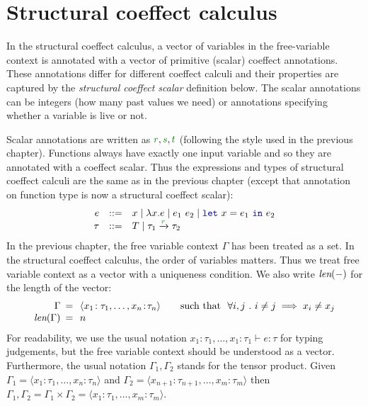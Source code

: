 \section{Structural coeffect calculus}
\label{sec:struct-calculus}

In the structural coeffect calculus, a vector of variables in the free-variable context is 
annotated with a vector of primitive (scalar) coeffect annotations. These annotations differ
for different coeffect calculi and their properties are captured by the \emph{structural 
coeffect scalar} definition below. The scalar annotations can be integers (how many past values we 
need) or annotations specifying whether a variable is live or not.

Scalar annotations are written as $\cclrd{r}, \cclrd{s}, \cclrd{t}$ (following the style used in 
the previous chapter). Functions always have exactly one input variable and so they are annotated
with a coeffect scalar. Thus the expressions and types of structural coeffect calculi are the same
as in the previous chapter (except that annotation on function type is now a structural coeffect 
scalar):
%
\begin{equation*}
\begin{array}{rcl}
e &::=& x \sep \lambda x.e \sep e_1~e_2 \sep \kvd{let}~x = e_1~\kvd{in}~e_2\\
\tau &::=& T \sep \tau_1 \xrightarrow{\cclrd{r}} \tau_2
\end{array}
\end{equation*}
%
In the previous chapter, the free variable context $\Gamma$ has been treated as a set. In the 
structural coeffect calculus, the order of variables matters. Thus we treat free variable context
as a vector with a uniqueness condition. We also write ${\textit{len}(-)}$ for the length
of the vector:
%
\begin{equation*}
\begin{array}{rcl}
 \Gamma &\narrow{=}& \langle x_1\!:\tau_1, \ldots, x_n\!:\!\tau_n \rangle \qquad \textnormal{such that}~~\forall i, j ~.~ i \neq j \implies x_i \neq x_j\\
 \xlen{\Gamma} &\narrow{=}& n
\end{array}
\end{equation*}
%
For readability, we use the usual notation $x_1\!:\!\tau_1, \ldots, x_1\!:\!\tau_1 \vdash e : \tau$ for
typing judgements, but the free variable context should be understood as a vector.
Furthermore, the usual notation $\Gamma_1, \Gamma_2$ stands for the tensor product.
Given $\Gamma_1 = \langle x_1\!:\tau_1, \ldots, x_n\!:\!\tau_n \rangle $ and
$\Gamma_2 = \langle x_{n+1}\!:\tau_{n+1}, \ldots, x_m\!:\!\tau_m \rangle $ then
$\Gamma_1, \Gamma_2 = \Gamma_1 \times \Gamma_2 = \langle x_1\!:\tau_1, \ldots, x_m\!:\!\tau_m \rangle$.

